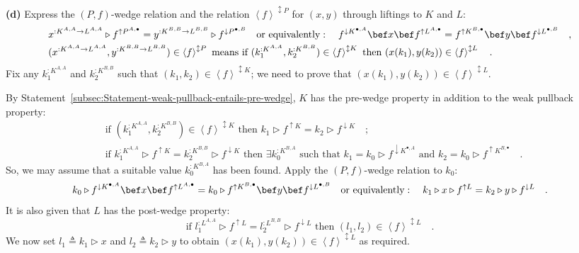 \textbf{(d)} Express the $\left(P,f\right)$-wedge relation and the
relation $\left<f\right>^{\updownarrow P}$ for $(x,y)$ through liftings
to $K$ and $L$:
\begin{align*}
 & x^{:K^{A,A}\rightarrow L^{A,A}}\triangleright f^{\uparrow P^{A,\bullet}}=y^{:K^{B,B}\rightarrow L^{B,B}}\triangleright f^{\downarrow P^{\bullet,B}}\quad\text{or equivalently}:\quad f^{\downarrow K^{\bullet,A}}\bef x\bef f^{\uparrow L^{A,\bullet}}=f^{\uparrow K^{B,\bullet}}\bef y\bef f^{\downarrow L^{\bullet,B}}\quad,\\
 & (x^{:K^{A,A}\rightarrow L^{A,A}},y^{:K^{B,B}\rightarrow L^{B,B}})\in\left<f\right>^{\updownarrow P}\text{ means if }(k_{1}^{:K^{A,A}},k_{2}^{:K^{B,B}})\in\left<f\right>^{\updownarrow K}\text{ then }(x(k_{1}),y(k_{2}))\in\left<f\right>^{\updownarrow L}\quad.
\end{align*}
Fix any $k_{1}^{:K^{A,A}}$ and $k_{2}^{:K^{B,B}}$ such that $(k_{1},k_{2})\in\left<f\right>^{\updownarrow K}$;
we need to prove that $(x(k_{1}),y(k_{2}))\in\left<f\right>^{\updownarrow L}$.

By Statement~\ref{subsec:Statement-weak-pullback-entails-pre-wedge},
$K$ has the pre-wedge property in addition to the weak pullback property:
\begin{align*}
 & \text{if }(k_{1}^{:K^{A,A}},k_{2}^{:K^{B,B}})\in\left<f\right>^{\updownarrow K}\text{ then }k_{1}\triangleright f^{\uparrow K}=k_{2}\triangleright f^{\downarrow K}\quad;\\
 & \text{if }k_{1}^{:K^{A,A}}\triangleright f^{\uparrow K}=k_{2}^{:K^{B,B}}\triangleright f^{\downarrow K}\text{ then }\exists k_{0}^{:K^{B,A}}\text{ such that }k_{1}=k_{0}\triangleright f^{\downarrow K^{\bullet,A}}\text{ and }k_{2}=k_{0}\triangleright f^{\uparrow K^{B,\bullet}}\quad.
\end{align*}
So, we may assume that a suitable value $k_{0}^{:K^{B,A}}$ has been
found. Apply the $\left(P,f\right)$-wedge relation to $k_{0}$:
\[
k_{0}\triangleright f^{\downarrow K^{\bullet,A}}\bef x\bef f^{\uparrow L^{A,\bullet}}=k_{0}\triangleright f^{\uparrow K^{B,\bullet}}\bef y\bef f^{\downarrow L^{\bullet,B}}\quad\text{or equivalently}:\quad k_{1}\triangleright x\triangleright f^{\uparrow L}=k_{2}\triangleright y\triangleright f^{\downarrow L}\quad.
\]
 It is also given that $L$ has the post-wedge property:
\[
\text{if }l_{1}^{:L^{A,A}}\triangleright f^{\uparrow L}=l_{2}^{:L^{B,B}}\triangleright f^{\downarrow L}\text{ then }(l_{1},l_{2})\in\left<f\right>^{\updownarrow L}\quad.
\]
We now set $l_{1}\triangleq k_{1}\triangleright x$ and $l_{2}\triangleq k_{2}\triangleright y$
to obtain $(x(k_{1}),y(k_{2}))\in\left<f\right>^{\updownarrow L}$
as required.

